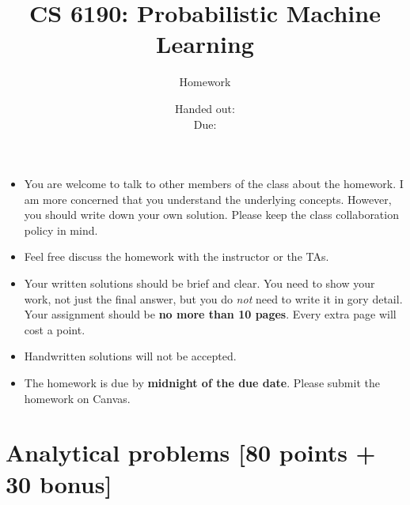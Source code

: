 \documentclass[12pt, fullpage,letterpaper]{article}
\title{CS 6190: Probabilistic Machine Learning \semester}
\author{Homework \assignmentId}
\date{Handed out: \releaseDate\\
  Due: \dueDate}
\begin{document}
\maketitle


\footnotesize
	\begin{itemize}
		\item You are welcome to talk to other members of the class about
		the homework. I am more concerned that you understand the
		underlying concepts. However, you should write down your own
		solution. Please keep the class collaboration policy in mind.
		
		\item Feel free discuss the homework with the instructor or the TAs.
		
		\item Your written solutions should be brief and clear. You need to
		show your work, not just the final answer, but you do \emph{not}
		need to write it in gory detail. Your assignment should be {\bf no
			more than 10 pages}. Every extra page will cost a point.
		
		\item Handwritten solutions will not be accepted.
		
		\item The homework is due by \textbf{midnight of the due date}. Please submit
		the homework on Canvas.
	\end{itemize}



\section*{Analytical problems [80 points + 30 bonus]}	
\label{sec:q1}
\end{document}
